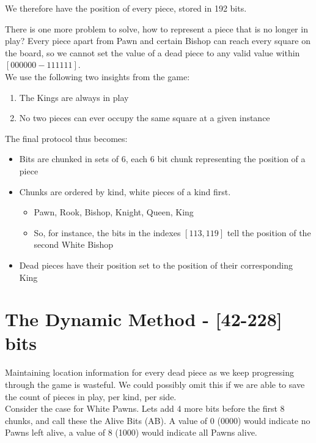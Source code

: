 \documentclass[journal]{journal}
\begin{document}
We therefore have the position of every piece, stored in 192 bits.

There is one more problem to solve, how to represent a piece that is no longer in play? Every piece apart from Pawn and certain Bishop can reach every square on the board, so we cannot set the value of a dead piece to any valid value within $[000000-111111]$.\\

We use the following two insights from the game:
\begin{enumerate}
    \item The Kings are always in play
    \item No two pieces can ever occupy the same square at a given instance
\end{enumerate}


The final protocol thus becomes:
\begin{itemize}
\item Bits are chunked in sets of 6, each 6 bit chunk representing the position of a piece
\item Chunks are ordered by kind, white pieces of a kind first.
    \begin{itemize}
        \item Pawn, Rook, Bishop, Knight, Queen, King
        \item So, for instance, the bits in the indexes $[113, 119]$ tell the position of the second White Bishop
    \end{itemize}
\item Dead pieces have their position set to the position of their corresponding King
\end{itemize}


\section{The Dynamic Method - [42-228] bits}
Maintaining location information for every dead piece as we keep progressing through the game is wasteful. We could possibly omit this if we are able to save the count of pieces in play, per kind, per side. \\

Consider the case for White Pawns. Lets add 4 more bits before the first 8 chunks, and call these the Alive Bits (AB). A value of 0 (0000) would indicate no Pawns left alive, a value of 8 (1000) would indicate all Pawns alive.\\
\end{document}

